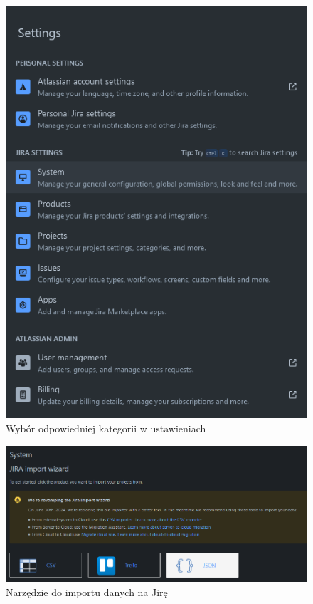 \begin{figure}[H]
    \centering
    \includegraphics[width=12cm,keepaspectratio]{rysunki/jira-settings.png}
    \caption{Wybór odpowiedniej kategorii w ustawieniach}
\end{figure}

\begin{figure}[H]
    \centering
    \includegraphics[width=12cm,keepaspectratio]{rysunki/jira-import-wizard.png}
    \caption{Narzędzie do importu danych na Jirę}
\end{figure}

